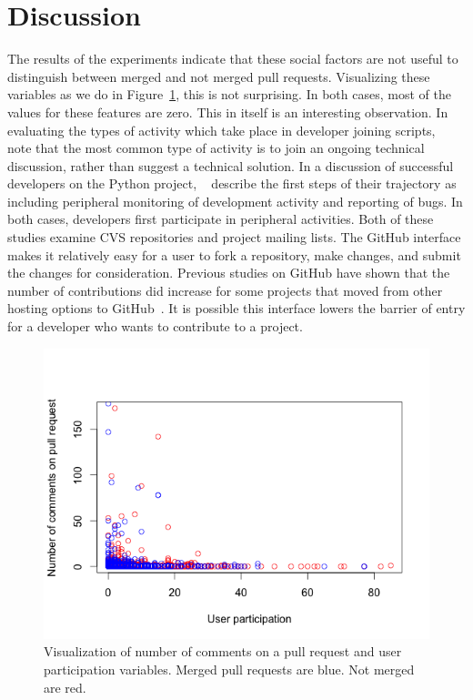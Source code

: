 \documentclass[12pt]{article}
\begin{document}
\section{Discussion}\label{discussion}
The results of the experiments indicate that these social factors are not useful
to distinguish between merged and not merged pull requests. Visualizing these
variables as we do in Figure~\ref{social_plot}, this is not surprising. In both
cases, most of the values for these features are zero. This in itself is an
interesting observation. In evaluating the types of activity which take place in
developer joining scripts, ~\cite{von_krogh_community_2003} note that the most
common type of activity is to join an ongoing technical discussion, rather than
suggest a technical solution. In a discussion of successful developers on the
Python project, ~\cite{ducheneaut_socialization_2005} describe the first steps
of their trajectory as including peripheral monitoring of development activity
and reporting of bugs. In both cases, developers first participate in peripheral
activities. Both of these studies examine CVS repositories and project mailing
lists. The GitHub interface makes it relatively easy for a user to fork a
repository, make changes, and submit the changes for consideration. Previous
studies on GitHub have shown that the number of contributions did increase for
some projects that moved from other hosting options to
GitHub~\cite{mcdonald_performance_2013}. It is possible this interface lowers
the barrier of entry for a developer who wants to contribute to a project.

\begin{figure}[p] \centering
\caption{Visualization of number of comments on a pull request and user
participation variables. Merged pull requests are blue. Not merged are red.}
\label{social_plot}
\includegraphics[scale=0.75]{figures/social_variables.png}
\end{figure}
\end{document}
